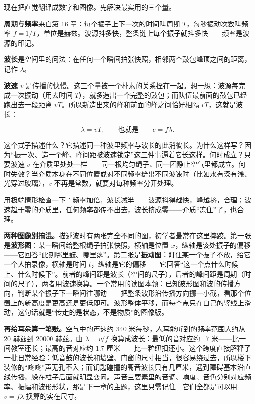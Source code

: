 \begin{mainline}
现在把直觉翻译成数字和图像。先解决最实用的三个量。

\textbf{周期与频率}来自第 16 章：每个振子上下一次的时间叫周期 \(T\)，每秒振动次数叫频率 \(f=1/T\)，单位是赫兹。波源抖多快，整条链上每个振子就抖多快——频率是波源的印记。

\textbf{波长}是空间里的问法：在任何一个瞬间拍张快照，相邻两个鼓包峰顶之间的距离，记作 \(\lambda\)。

\textbf{波速} \(v\) 是传播的快慢。这三个量被一个朴素的关系拴在一起。想一想：波源每完成一次振动（用去时间 \(T\)），就多造出一个完整的鼓包；而队伍最前面的鼓包已经跑出去一段距离 \(vT\)。所以新造出来的峰和前面的峰之间恰好相隔 \(vT\)，这就是波长：

\[
  \lambda = vT, \qquad \text{也就是} \qquad v = f\lambda .
\]

这个式子描述什么？它描述同一种波里频率与波长的此消彼长。为什么这样写？因为“振一次、造一个峰、峰间距被波速锁定”这三件事逼着它长这样。何时成立？只要波速 \(v\) 在介质里处处一样——同一根均匀绳子、同一团静止空气里都成立。何时失效？当介质本身在不同位置或对不同频率给出不同波速时（比如水有深有浅、光穿过玻璃），\(v\) 不再是常数，就要对每种频率分开处理。

用极端情形检查一下：频率加倍，波长减半——波源抖得越快，峰越挤，合理；波速趋于零的介质里，任何频率都传不出去，波长挤成零——介质“冻住”了，也合理。
\end{mainline}

\begin{mainline}
\textbf{两种图像别搞混。}描述波时有两张完全不同的图，初学者最常在这里摔跤。第一张是\textbf{波形图}：某一瞬间给整根绳子拍张快照，横轴是位置 \(x\)，纵轴是该处振子的偏移——它回答“此刻哪里鼓、哪里瘪”。第二张是\textbf{振动图}：盯住某一个振子不放，给它一个人拍录像，横轴是时间 \(t\)，纵轴是它的偏移——它回答“这一个点什么时候上、什么时候下”。前者的峰间距是波长（空间的尺子），后者的峰间距是周期（时间的尺子），两者用波速换算。一个常用的读图本领：已知波形图和波的传播方向，判断某个振子下一瞬间往哪动——把整条波形沿传播方向挪一小截，看那个位置上的新高度是更高还是更低即可。波形整体平移，而每个点只在自己的竖线上滑动，这句话就是“传走的是状态，不是物质”的图像版。
\end{mainline}

\begin{mainline}
\textbf{再给耳朵算一笔账。}空气中的声速约 \(340\) 米每秒，人耳能听到的频率范围大约从 \(20\) 赫兹到 \(20000\) 赫兹。由 \(\lambda = v/f\) 换算成波长：最低的音对应约 \(17\) 米——比一间教室还长；最高的音对应约 \(1.7\) 厘米——比一粒纽扣还小。这个跨度直接解释了一批日常经验：低音鼓的波长和墙壁、门窗的尺寸相当，很容易绕过去，所以楼下装修的“咚咚”声无孔不入；而钥匙碰撞的高音波长只有几厘米，遇到障碍基本沿直线传播，躲在柱子后面就明显变闷。声音三要素里的音调、响度、音色分别对应频率、振幅和波形形状，那是下一章的主题，这里只需记住：它们全都是可以用 \(v=f\lambda\) 换算的实在尺寸。
\end{mainline}

